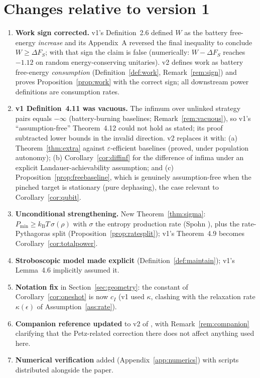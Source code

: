\documentclass[11pt,a4paper]{article}
\theoremstyle{plain}
\theoremstyle{definition}
\theoremstyle{remark}
\newcommand{\kB}{k_{\mathrm{B}}}
\newcommand{\Pmin}{P_{\min}}
\begin{document}
\section{Changes relative to version 1}\label{app:changelog}

\begin{enumerate}
\item \textbf{Work sign corrected.} v1's Definition~2.6 defined $W$ as the
battery free-energy \emph{increase} and its Appendix~A reversed the final
inequality to conclude $W \ge \Delta F_S$; with that sign the claim is false
(numerically: $W - \Delta F_S$ reaches $-1.12$ on random energy-conserving
unitaries). v2 defines work as battery free-energy \emph{consumption}
(Definition~\ref{def:work}, Remark~\ref{rem:sign}) and proves
Proposition~\ref{prop:work} with the correct sign; all downstream power
definitions are consumption rates.
\item \textbf{v1 Definition~4.11 was vacuous.} The infimum over unlinked
strategy pairs equals $-\infty$ (battery-burning baselines;
Remark~\ref{rem:vacuous}), so v1's ``assumption-free'' Theorem~4.12 could not
hold as stated; its proof subtracted lower bounds in the invalid direction.
v2 replaces it with: (a) Theorem~\ref{thm:extra} against
$\varepsilon$-efficient baselines (proved, under population autonomy); (b)
Corollary~\ref{cor:diffinf} for the difference of infima under an explicit
Landauer-achievability assumption; and (c)
Proposition~\ref{prop:freebaseline}, which is genuinely assumption-free when
the pinched target is stationary (pure dephasing), the case relevant to
Corollary~\ref{cor:qubit}.
\item \textbf{Unconditional strengthening.} New Theorem~\ref{thm:sigma}:
$\Pmin \ge \kB T\,\sigma(\rho)$ with $\sigma$ the entropy production rate
(Spohn \cite{Spohn78}), plus the rate-Pythagoras split
(Proposition~\ref{prop:ratesplit}); v1's Theorem~4.9 becomes
Corollary~\ref{cor:totalpower}.
\item \textbf{Stroboscopic model made explicit}
(Definition~\ref{def:maintain}); v1's Lemma~4.6 implicitly assumed it.
\item \textbf{Notation fix} in Section~\ref{sec:geometry}: the constant of
Corollary~\ref{cor:oneshot} is now $c_I$ (v1 used $\kappa$, clashing with the
relaxation rate $\kappa(\epsilon)$ of Assumption~\ref{ass:rate}).
\item \textbf{Companion reference updated} to v2 of \cite{Companion}, with
Remark~\ref{rem:companion} clarifying that the Petz-related correction there
does not affect anything used here.
\item \textbf{Numerical verification} added
(Appendix~\ref{app:numerics}) with scripts distributed alongside the paper.
\end{enumerate}
\end{document}
